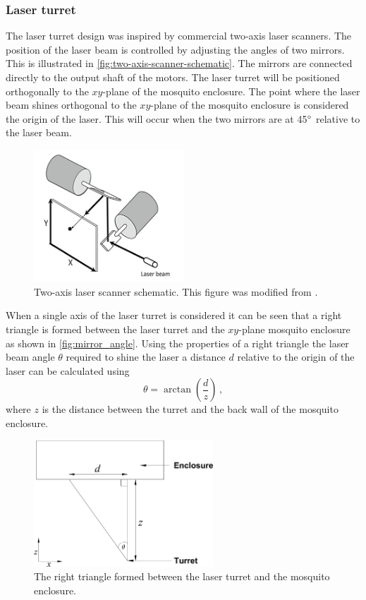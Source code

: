 \subsubsection{Laser turret}\label{subsubsec:laser_turret_design}
The laser turret design was inspired by commercial two-axis laser scanners. The position of the laser beam is controlled by adjusting the angles of two mirrors. This is illustrated in \autoref{fig:two-axis-scanner-schematic}. The mirrors are connected directly to the output shaft of the motors. The laser turret will be positioned orthogonally to the $xy$-plane of the mosquito enclosure. The point where the laser beam shines orthogonal to the $xy$-plane of the mosquito enclosure is considered the origin of the laser. This will occur when the two mirrors are at 45$^{\circ}$ relative to the laser beam.
\begin{figure}[h]
  \centering
  \includegraphics[width=0.5\textwidth]{figures/hardware_design/two_axis_scanner.png}
  \caption{Two-axis laser scanner schematic. This figure was modified from \cite{two-axis-scanner-schematic}.}
  \label{fig:two-axis-scanner-schematic}
\end{figure}

When a single axis of the laser turret is considered it can be seen that a right triangle is formed between the laser turret and the $xy$-plane mosquito enclosure as shown in \autoref{fig:mirror_angle}. Using the properties of a right triangle the laser beam angle $\theta$ required to shine the laser a distance $d$ relative to the origin of the laser can be calculated using
\begin{equation}
  \theta = \arctan{\left(\frac{d}{z}\right)}\,,
  \label{eq:mirror_angle}
\end{equation}
where $z$ is the distance between the turret and the back wall of the mosquito enclosure.
\begin{figure}[h]
  \centering
  \includegraphics[width=0.6\textwidth]{figures/hardware_design/mirror_angle.pdf}
  \caption{The right triangle formed between the laser turret and the mosquito enclosure.}
  \label{fig:mirror_angle}
\end{figure}

